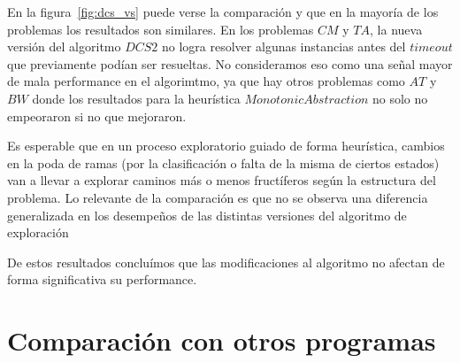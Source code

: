 En la figura~\ref{fig:dcs_vs} puede verse la comparación y que en la mayoría de los problemas los resultados son similares. En los problemas $CM$ y $TA$, la nueva versión del algoritmo $DCS2$ no logra resolver algunas instancias antes del $timeout$ que previamente podían ser resueltas. No consideramos eso como una señal mayor de mala performance en el algorimtmo, ya que hay otros problemas como $AT$ y $BW$ donde los resultados para la heurística $Monotonic Abstraction$ no solo no empeoraron si no que mejoraron.

Es esperable que en un proceso exploratorio guiado de forma heurística, cambios en la poda de ramas (por la clasificación o falta de la misma de ciertos estados) van a llevar a explorar caminos más o menos fructíferos según la estructura del problema. Lo relevante de la comparación es que no se observa una diferencia generalizada en los desempeños de las distintas versiones del algoritmo de exploración

De estos resultados concluímos que las modificaciones al algoritmo no afectan de forma significativa su performance.

\section{Comparación con otros programas}











